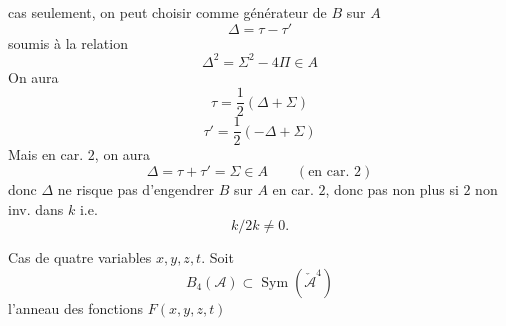 cas seulement, on peut choisir comme générateur de $B$ sur $A$
\[
\Delta=\tau-\tau'
\]
soumis à la relation
\[
\Delta^2=\Sigma^2-4\Pi\in A
\]
On aura
\[
\tau=\frac12(\Delta+\Sigma)
\]
\[
\tau'=\frac12(-\Delta+\Sigma)
\]
Mais en car. $2$, on aura
\[
\Delta=\tau+\tau'=\Sigma\in A\qquad(\text{en car. }2)
\]
donc $\Delta$ ne risque pas d'engendrer $B$ sur $A$ en car. $2$, donc pas non plus si $2$ non inv. dans $k$ i.e.
\[
k/2k\ne0.
\]

Cas de quatre variables $x,y,z,t$.
Soit
\[
B_4(\mathcal{A})\subset\operatorname{Sym}(\check{\mathcal{A}}^{4})
\]
l'anneau des fonctions  $F(x,y,z,t)$
